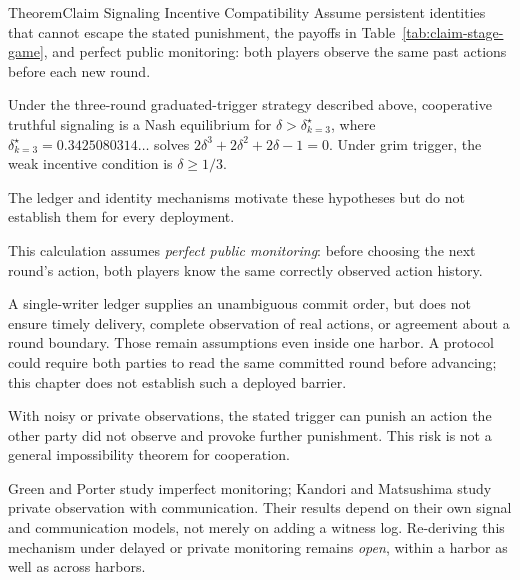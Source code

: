 \documentclass[11pt,a4paper]{article}
\theoremstyle{definition}
\theoremstyle{remark}
\begin{document}
\begin{pdclaim}{Theorem}{Claim Signaling Incentive Compatibility}
\setlength{\parskip}{4pt plus 1pt}
\label{prop:claim-signaling-ic}
Assume persistent identities that cannot escape the stated punishment, the payoffs in Table~\ref{tab:claim-stage-game}, and perfect public monitoring: both players observe the same past actions before each new round. 

Under the three-round graduated-trigger strategy described above, cooperative truthful signaling is a Nash equilibrium for $\delta>\delta^\star_{k=3}$, where $\delta^\star_{k=3}=0.3425080314\ldots$ solves $2\delta^3+2\delta^2+2\delta-1=0$. Under grim trigger, the weak incentive condition is $\delta\ge1/3$. 

The ledger and identity mechanisms motivate these hypotheses but do not establish them for every deployment.
\end{pdclaim}

\begin{pdboundary}
\setlength{\parskip}{4pt plus 1pt}
This calculation assumes \emph{perfect public monitoring}: before choosing the
next round's action, both players know the same correctly observed action history.


A single-writer ledger supplies an unambiguous commit order, but does not ensure
timely delivery, complete observation of real actions, or agreement about a
round boundary. Those remain assumptions even inside one harbor. A protocol
could require both parties to read the same committed round before advancing;
this chapter does not establish such a deployed barrier.

With noisy or private observations, the stated trigger can punish an action the
other party did not observe and provoke further punishment. This risk is not a
general impossibility theorem for cooperation. 

Green and Porter
 study imperfect monitoring; Kandori and Matsushima
 study private observation with communication.
Their results depend on their own signal and communication models, not merely
on adding a witness log. Re-deriving this mechanism under delayed or private
monitoring remains \emph{open}, within a harbor as well as across harbors.
\end{pdboundary}
\end{document}
